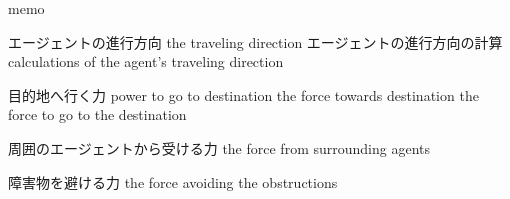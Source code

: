 %

memo

エージェントの進行方向
the traveling direction
エージェントの進行方向の計算
calculations of the agent's traveling direction

目的地へ行く力
power to go to destination
the force towards destination
the force to go to the destination

周囲のエージェントから受ける力
the force from surrounding agents

障害物を避ける力
the force avoiding the obstructions

\fi

